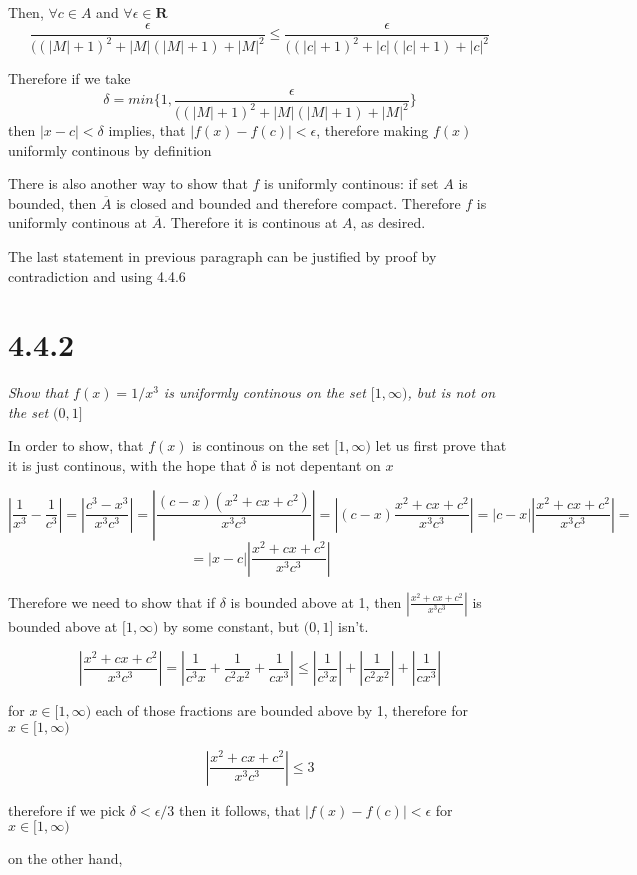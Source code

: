 \documentclass[11pt,oneside,titlepage]{book}
\begin{document}
Then, $\forall c \in A$ and $\forall \epsilon \in \textbf{R}$
$$\frac{\epsilon}{((|M| + 1)^{2} + |M|(|M| + 1) + |M|^2}  \leq
\frac{\epsilon}{((|c| + 1)^{2} + |c|(|c| + 1) + |c|^2} $$

Therefore if we take
$$\delta = min\{1, \frac{\epsilon}{((|M| + 1)^{2} + |M|(|M| + 1) + |M|^2}\} $$
then $|x - c| < \delta$ implies, that $ |f(x) - f(c)| < \epsilon$, therefore
making $f(x)$ uniformly continous by definition

There is also another way to show that $f$ is uniformly continous:
if set $A$ is bounded, then $\overline A$ is closed and bounded and therefore
compact. Therefore $f$ is uniformly continous at $\overline A$. Therefore
it is continous at $A$, as desired.

The last statement in previous paragraph can be justified by proof by
contradiction and using 4.4.6

\section*{4.4.2}
\textit{Show that $f(x) = 1/x^3$  is uniformly continous on the set
  $[1, \infty)$, but is not on the set $(0, 1]$}

In order to show, that $f(x)$ is continous on the set $[1, \infty)$ let us
first prove that it is just continous, with the hope that $\delta$ is not
depentant on $x$

$$ |\frac{1}{x^3} - \frac{1}{c^3}| = |\frac{c^3 - x^3}{x^3c^3}| =
|\frac{(c - x)(x^2 + cx + c^2)}{x^3c^3}|
= |(c - x) \frac{x^2 + cx + c^2}{x^3c^3}| =
|c - x||\frac{x^2 + cx + c^2}{x^3c^3}| =$$
$$ = |x - c||\frac{x^2 + cx + c^2}{x^3c^3}| $$

Therefore we need to show that if $\delta$ is bounded above at 1, then
$|\frac{x^2 + cx + c^2}{x^3c^3}|$ is bounded above at $[1, \infty)$ by
some constant, but  $(0, 1]$ isn't.

$$ |\frac{x^2 + cx + c^2}{x^3c^3}| = |\frac{1}{c^3 x} + \frac{1}{c^2x^2}
+ \frac{1}{cx^3}| \leq
|\frac{1}{c^3 x}| + |\frac{1}{c^2x^2}| + |\frac{1}{cx^3}|
$$

for $x \in [1, \infty)$ each of those fractions are bounded above by 1,
therefore for $x \in [1, \infty)$

$$ |\frac{x^2 + cx + c^2}{x^3c^3}| \leq 3 $$

therefore if we pick $\delta < \epsilon / 3 $ then it follows, that
$|f(x) - f(c)| < \epsilon$ for $x \in [1, \infty)$

on the other hand,
\end{document}
